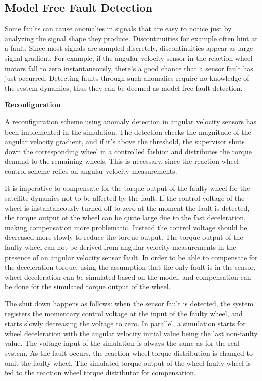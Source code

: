 \subsection{Model Free Fault Detection}

Some faults can cause anomalies in signals that are easy to notice just by analyzing the signal shape they produce. Discontinuities for example often hint at a fault. Since most signals are sampled discretely, discontinuities appear as large signal gradient. For example, if the angular velocity sensor in the reaction wheel motors fall to zero instantaneously, there's a good chance that a sensor fault has just occurred. Detecting faults through such anomalies require no knowledge of the system dynamics, thus they can be deemed as model free fault detection.

\textbf{Reconfiguration}

A reconfiguration scheme using anomaly detection in angular velocity sensors has been implemented in the simulation. The detection checks the magnitude of the angular velocity gradient, and if it's above the threshold, the supervisor shuts down the corresponding wheel in a controlled fashion and distributes the torque demand to the remaining wheels. This is necessary, since the reaction wheel control scheme relies on angular velocity measurements. 

It is imperative to compensate for the torque output of the faulty wheel for the satellite dynamics not to be affected by the fault. If the control voltage of the wheel is instantaneously turned off to zero at the moment the fault is detected, the torque output of the wheel can be quite large due to the fast deceleration, making compensation more problematic. Instead the control voltage should be decreased more slowly to reduce the torque output. The torque output of the faulty wheel can not be derived from angular velocity measurements in the presence of an angular velocity sensor fault. In order to be able to compensate for the deceleration torque, using the assumption that the only fault is in the sensor, wheel deceleration can be simulated based on the model, and compensation can be done for the simulated torque output of the wheel.

The shut down happens as follows: when the sensor fault is detected, the system registers the momentary control voltage at the input of the faulty wheel, and starts slowly decreasing the voltage to zero. In parallel, a simulation starts for wheel deceleration with the angular velocity initial value being the last non-faulty value. The voltage input of the simulation is always the same as for the real system. As the fault occurs, the reaction wheel torque distribution is changed to omit the faulty wheel. The simulated torque output of the wheel faulty wheel is fed to the reaction wheel torque distributor for compensation.